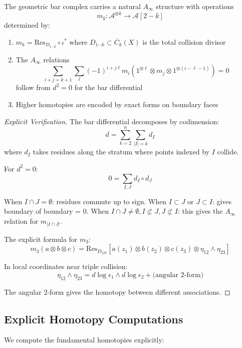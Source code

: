 \begin{theorem}
The geometric bar complex carries a natural $A_\infty$ structure with operations
$$m_k: \mathcal{A}^{\otimes k} \to \mathcal{A}[2-k]$$
determined by:
\begin{enumerate}
\item $m_k = \text{Res}_{D_{1\cdots k}} \circ \iota^*$ where $D_{1\cdots k} \subset \overline{C}_k(X)$ is the total collision divisor
\item The $A_\infty$ relations 
$$\sum_{i+j=k+1} \sum_{\ell} (-1)^{i+j\ell} m_i(1^{\otimes \ell} \otimes m_j \otimes 1^{\otimes(i-\ell-1)}) = 0$$
follow from $d^2 = 0$ for the bar differential
\item Higher homotopies are encoded by exact forms on boundary faces
\end{enumerate}
\end{theorem}

\begin{proof}[Explicit Verification]
The bar differential decomposes by codimension:
$$d = \sum_{k=2}^n \sum_{|I|=k} d_I$$
where $d_I$ takes residues along the stratum where points indexed by $I$ collide.

For $d^2 = 0$:
$$0 = \sum_{I,J} d_I \circ d_J$$

When $I \cap J = \emptyset$: residues commute up to sign.
When $I \subset J$ or $J \subset I$: gives boundary of boundary = 0.
When $I \cap J \neq \emptyset, I \not\subset J, J \not\subset I$: 
this gives the $A_\infty$ relation for $m_{|I \cap J|}$.

The explicit formula for $m_3$:
$$m_3(a \otimes b \otimes c) = \text{Res}_{D_{123}}\left[a(z_1) \otimes b(z_2) \otimes c(z_3) \otimes \eta_{12} \wedge \eta_{23}\right]$$

In local coordinates near triple collision:
$$\eta_{12} \wedge \eta_{23} = d\log\epsilon_1 \wedge d\log\epsilon_2 + \text{(angular 2-form)}$$

The angular 2-form gives the homotopy between different associations.
\end{proof}
 
\subsection{Explicit Homotopy Computations}
 
We compute the fundamental homotopies explicitly:
 
